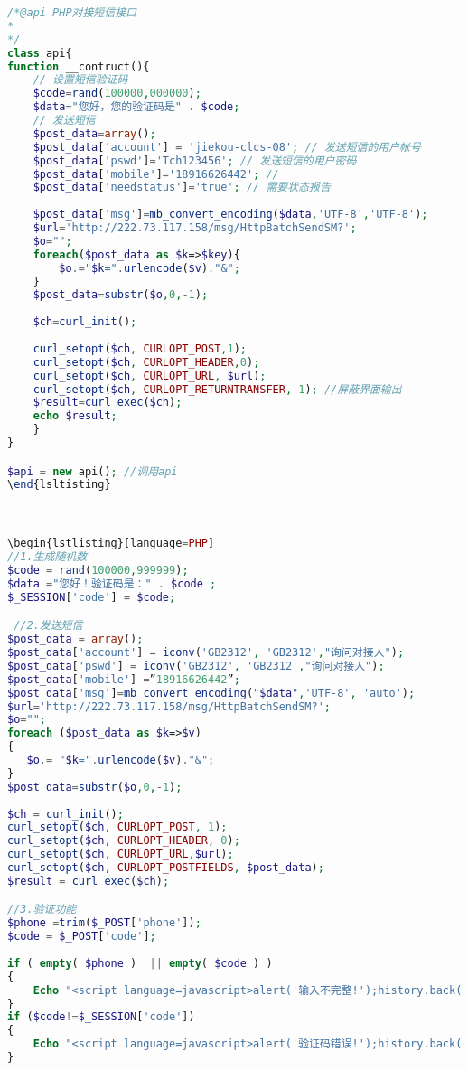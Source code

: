 \documentclass[11pt]{book} %
\begin{document}
\begin{lstlisting}[language=PHP]
/*@api PHP对接短信接口
* 
*/
class api{
function __contruct(){
	// 设置短信验证码
	$code=rand(100000,000000);
	$data="您好，您的验证码是" . $code;
	// 发送短信
	$post_data=array();
	$post_data['account'] = 'jiekou-clcs-08'; // 发送短信的用户帐号
	$post_data['pswd']='Tch123456'; // 发送短信的用户密码
	$post_data['mobile']='18916626442'; // 
	$post_data['needstatus']='true'; // 需要状态报告
	
	$post_data['msg']=mb_convert_encoding($data,'UTF-8','UTF-8');
	$url='http://222.73.117.158/msg/HttpBatchSendSM?';
	$o="";
	foreach($post_data as $k=>$key){
		$o.="$k=".urlencode($v)."&";
	}
	$post_data=substr($o,0,-1);
	
	$ch=curl_init();
	
	curl_setopt($ch, CURLOPT_POST,1);
	curl_setopt($ch, CURLOPT_HEADER,0);
	curl_setopt($ch, CURLOPT_URL, $url);
	curl_setopt($ch, CURLOPT_RETURNTRANSFER, 1); //屏蔽界面输出
	$result=curl_exec($ch);
	echo $result;
	}
}

$api = new api(); //调用api
\end{lsltisting}



\begin{lstlisting}[language=PHP]
//1.生成随机数
$code = rand(100000,999999);
$data ="您好！验证码是：" . $code ;
$_SESSION['code'] = $code;

 //2.发送短信
$post_data = array();
$post_data['account'] = iconv('GB2312', 'GB2312',"询问对接人");
$post_data['pswd'] = iconv('GB2312', 'GB2312',"询问对接人");
$post_data['mobile'] =”18916626442”;
$post_data['msg']=mb_convert_encoding("$data",'UTF-8', 'auto');
$url='http://222.73.117.158/msg/HttpBatchSendSM?'; 
$o="";
foreach ($post_data as $k=>$v)
{
   $o.= "$k=".urlencode($v)."&";
}
$post_data=substr($o,0,-1);
 
$ch = curl_init();
curl_setopt($ch, CURLOPT_POST, 1);
curl_setopt($ch, CURLOPT_HEADER, 0);
curl_setopt($ch, CURLOPT_URL,$url);
curl_setopt($ch, CURLOPT_POSTFIELDS, $post_data);
$result = curl_exec($ch);

//3.验证功能
$phone =trim($_POST['phone']);
$code = $_POST['code'];
 
if ( empty( $phone )  || empty( $code ) )
{
	Echo "<script language=javascript>alert('输入不完整!');history.back(1);</script>" ;
}
if ($code!=$_SESSION['code'])
{
	Echo "<script language=javascript>alert('验证码错误!');history.back(1);</script>" ;
}
\end{lstlisting}
\end{document}
